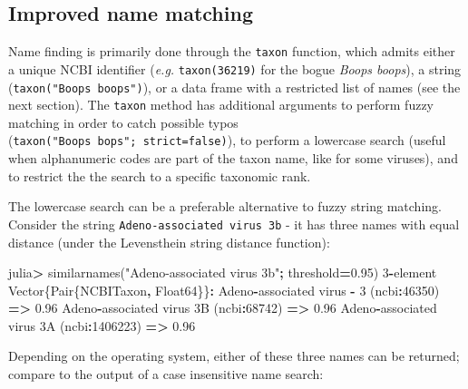\documentclass[10pt,oneside]{article}
\newenvironment{Shaded}{\begin{snugshade}}{\end{snugshade}}
\newcommand{\DataTypeTok}[1]{\textcolor[rgb]{0.13,0.29,0.53}{#1}}
\newcommand{\FloatTok}[1]{\textcolor[rgb]{0.00,0.00,0.81}{#1}}
\newcommand{\StringTok}[1]{\textcolor[rgb]{0.31,0.60,0.02}{#1}}
\newcommand{\OperatorTok}[1]{\textcolor[rgb]{0.81,0.36,0.00}{\textbf{#1}}}
\newcommand{\NormalTok}[1]{#1}
\begin{document}
\hypertarget{improved-name-matching}{%
\subsection{Improved name matching}\label{improved-name-matching}}

Name finding is primarily done through the \texttt{taxon} function,
which admits either a unique NCBI identifier (\emph{e.g.}
\texttt{taxon(36219)} for the bogue \emph{Boops boops}), a string
(\texttt{taxon("Boops\ boops")}), or a data frame with a restricted list
of names (see the next section). The \texttt{taxon} method has
additional arguments to perform fuzzy matching in order to catch
possible typos (\texttt{taxon("Boops\ bops";\ strict=false)}), to
perform a lowercase search (useful when alphanumeric codes are part of
the taxon name, like for some viruses), and to restrict the the search
to a specific taxonomic rank.

The lowercase search can be a preferable alternative to fuzzy string
matching. Consider the string \texttt{Adeno-associated\ virus\ 3b} - it
has three names with equal distance (under the Levensthein string
distance function):

\begin{Shaded}
\begin{Highlighting}[]
\NormalTok{julia}\OperatorTok{\textgreater{}}\NormalTok{ similarnames(}\StringTok{"Adeno{-}associated virus 3b"}\OperatorTok{;}\NormalTok{ threshold}\OperatorTok{=}\FloatTok{0.95}\NormalTok{)}
\FloatTok{3}\OperatorTok{{-}}\NormalTok{element }\DataTypeTok{Vector}\NormalTok{\{}\DataTypeTok{Pair}\NormalTok{\{NCBITaxon}\OperatorTok{,} \DataTypeTok{Float64}\NormalTok{\}\}}\OperatorTok{:}
\NormalTok{  Adeno}\OperatorTok{{-}}\NormalTok{associated virus }\OperatorTok{{-}} \FloatTok{3}\NormalTok{ (ncbi}\OperatorTok{:}\FloatTok{46350}\NormalTok{) }\OperatorTok{=\textgreater{}} \FloatTok{0.96}
\NormalTok{   Adeno}\OperatorTok{{-}}\NormalTok{associated virus }\FloatTok{3}\NormalTok{B (ncbi}\OperatorTok{:}\FloatTok{68742}\NormalTok{) }\OperatorTok{=\textgreater{}} \FloatTok{0.96}
\NormalTok{ Adeno}\OperatorTok{{-}}\NormalTok{associated virus }\FloatTok{3}\NormalTok{A (ncbi}\OperatorTok{:}\FloatTok{1406223}\NormalTok{) }\OperatorTok{=\textgreater{}} \FloatTok{0.96}
\end{Highlighting}
\end{Shaded}

Depending on the operating system, either of these three names can be
returned; compare to the output of a case insensitive name search:
\end{document}

